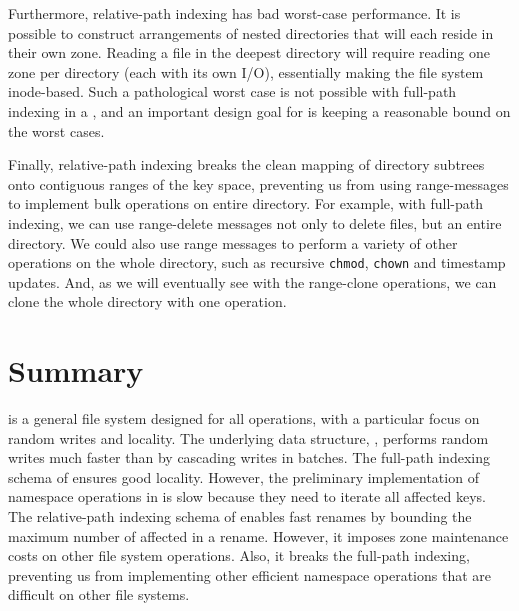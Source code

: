Furthermore, relative-path indexing has bad worst-case performance.
It is possible to construct arrangements of nested directories that will each
reside in their own zone.
Reading a file in the deepest directory will require reading one zone per
directory (each with its own I/O),
essentially making the file system inode-based.
Such a pathological worst case is not possible with full-path indexing in a
\bet, and an important design goal for \betrfs is keeping a reasonable bound on
the worst cases.

Finally, relative-path indexing breaks the clean mapping of directory subtrees
onto contiguous ranges of the key space,
preventing us from using range-messages to implement bulk operations on entire
directory.
For example, with full-path indexing, we can use range-delete messages not
only to delete files, but an entire directory.
We could also use range messages to perform a variety of other operations on
the whole directory, such as recursive \texttt{chmod}, \texttt{chown} and
timestamp updates.
And, as we will eventually see with the range-clone operations, we can clone the
whole directory with one operation.

\section{Summary}

\betrfs is a general file system designed for all operations, with a particular
focus on random writes and locality.
The underlying data structure, \bets, performs random writes much faster than
\btrees by cascading writes in batches.
The full-path indexing schema of \betrfsOne ensures good locality.
However, the preliminary implementation of namespace operations in \betrfsOne
is slow because they need to iterate all affected keys.
The relative-path indexing schema of \betrfsTwo enables fast renames by bounding
the maximum number of affected in a rename.
However, it imposes zone maintenance costs on other file system operations.
Also, it breaks the full-path indexing, preventing us from implementing other
efficient namespace operations that are difficult on other file systems.

